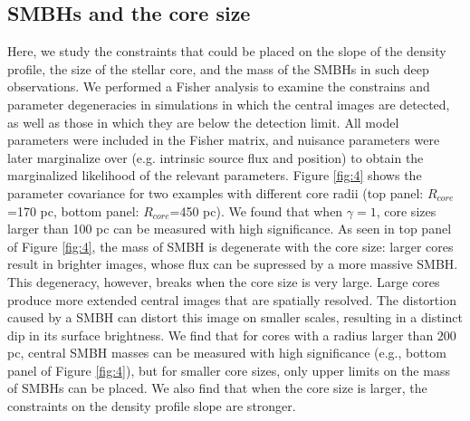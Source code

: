 \documentclass[chicago]{emulateapj}
\begin{document}
\subsection{SMBHs and the core size}
Here, we study the constraints that could be placed on the slope of the density profile, the size of the stellar core, and the mass of the SMBHs in such deep observations. 
We performed a Fisher analysis to examine the constrains and parameter degeneracies in simulations in which the central images are detected, as well as those in which they are below the detection limit. All model parameters were included in the Fisher matrix, and nuisance parameters were later marginalize over (e.g. intrinsic source flux and position) to obtain the marginalized likelihood of the relevant parameters.  
 Figure \ref{fig:4} shows the parameter covariance for two examples with different core radii (top panel:  $R_{core}$=170 pc, bottom panel: $R_{core}$=450 pc).
We found that when $\gamma=1$, core sizes larger than 100 pc can be measured with high significance. As seen in top panel of Figure \ref{fig:4}, 
the mass of SMBH is degenerate with the core size: larger cores result in brighter images, whose flux can be supressed by a more massive SMBH.
This degeneracy,  however,  breaks when the core size is very large. 
Large cores produce more extended central images that are spatially resolved. The distortion caused by a SMBH can distort this image on smaller scales, resulting in a distinct dip in its surface brightness. %
We find that for cores with a radius larger than $200$ pc, central SMBH masses can be measured with high significance (e.g., bottom panel of Figure \ref{fig:4}), but for smaller core sizes, only upper limits on the mass of SMBHs can be placed.
We also find that when the core size is larger, the constraints on the density profile slope are stronger.

\end{document}
